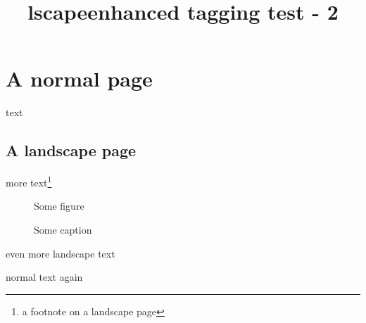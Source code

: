 \documentclass{article}
\title{lscapeenhanced tagging test - 2}
\begin{document}
\section{A normal page}
text

\begin{landscape}
\section{A landscape page}
more text\footnote{a footnote on a landscape page}
\begin{figure}
\centering
Some figure
\caption{Some caption}
\end{figure}

\newpage

even more landscape text
\end{landscape}

normal text again
\end{document}
